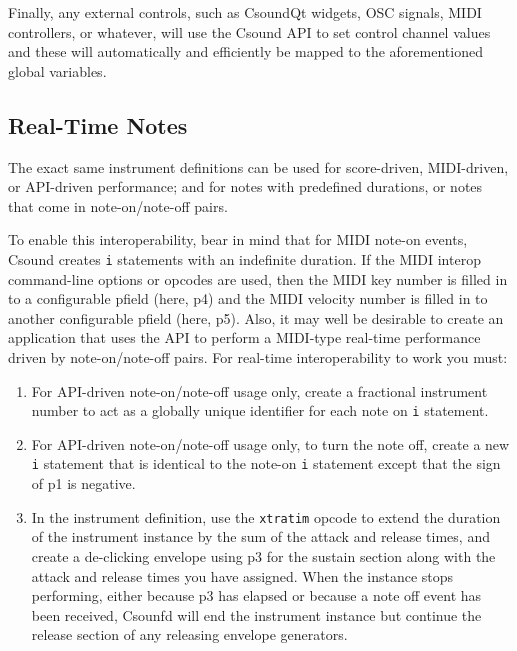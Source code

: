 \documentclass[12pt,letterpaper,onecolumn]{scrartcl}
\begin{document}
\begin{enumerate}
Finally, any external controls, such as CsoundQt widgets, OSC signals, MIDI
controllers, or whatever, will use the Csound API to set control channel values 
and these will automatically and efficiently be mapped to the aforementioned 
global variables.

\subsection{Real-Time Notes}

The exact same instrument definitions can be used for score-driven,
MIDI-driven, or API-driven performance; and for notes with predefined
durations, or notes that come in note-on/note-off pairs.

To enable this interoperability, bear in mind that for MIDI note-on events,
Csound creates \texttt{i} statements with an indefinite duration. If the MIDI
interop command-line options or opcodes are used, then the MIDI key number is
filled in to a configurable pfield (here, p4) and the MIDI velocity number is
filled in to another configurable pfield (here, p5). Also, it may well be
desirable to create an application that uses the API to perform a MIDI-type
real-time performance driven by note-on/note-off pairs. For real-time
interoperability to work you must:

\begin{enumerate}
    \item For API-driven note-on/note-off usage only, create a fractional
    instrument number to act as a globally unique identifier for each note on
\texttt{i} statement.
    \item For API-driven note-on/note-off usage only, to turn the note off,
    create a new \texttt{i} statement that is identical to the note-on
\texttt{i} statement except that the sign of p1 is negative.
    \item In the instrument definition, use the \texttt{xtratim} opcode to extend the
    duration of the instrument instance by the sum of the attack and release
    times, and create a de-clicking envelope using p3 for the sustain section along
    with the attack and release times you have assigned.
When the instance stops performing, either because p3 has elapsed or because a note
off event has been received, Csounfd will end the instrument instance but continue the
release section of any releasing envelope generators.
\end{enumerate}

\end{enumerate}
\end{document}

